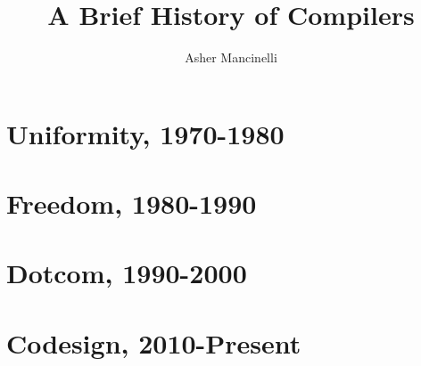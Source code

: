 \documentclass[12pt,openany]{book}
\title{A Brief History of Compilers}
\author{Asher Mancinelli}
\date{}
\begin{document}
\maketitle
\tableofcontents








\chapter{Uniformity, 1970-1980}
\chapter{Freedom, 1980-1990}
\chapter{Dotcom, 1990-2000}
\chapter{Codesign, 2010-Present}



\nocite{*}
\printbibliography[heading=bibintoc]
\end{document}
